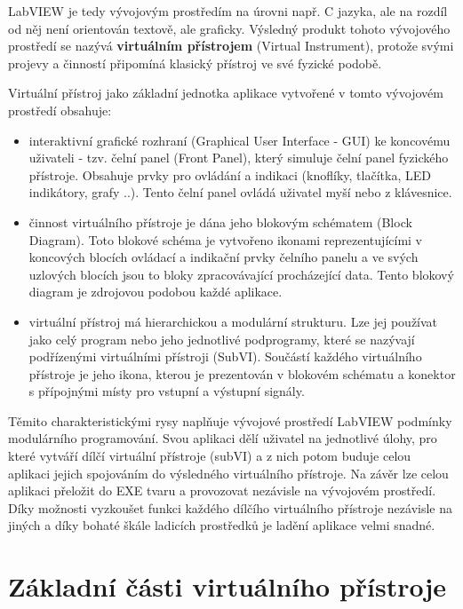    LabVIEW je tedy vývojovým prostředím na úrovni např. C jazyka, ale na rozdíl od něj není
   orientován textově, ale graficky. Výsledný produkt tohoto vývojového prostředí se nazývá
   \textbf{virtuálním přístrojem} (Virtual Instrument), protože svými projevy a činností připomíná
   klasický přístroj ve své fyzické podobě.
  
   Virtuální přístroj jako základní jednotka aplikace vytvořené v tomto vývojovém prostředí
   obsahuje:
   \begin{itemize}
     \item interaktivní grafické rozhraní (Graphical User Interface - GUI) ke koncovému uživateli -
           tzv. čelní panel (Front Panel), který simuluje čelní panel fyzického přístroje. Obsahuje
           prvky pro ovládání a indikaci (knoflíky, tlačítka, LED indikátory, grafy ..). Tento
           čelní panel ovládá uživatel myší nebo z klávesnice.
     \item činnost virtuálního přístroje je dána jeho blokovým schématem (Block Diagram). Toto
           blokové schéma je vytvořeno ikonami reprezentujícími v koncových blocích ovládací a
           indikační prvky čelního panelu a ve svých uzlových blocích jsou to bloky zpracovávající
           procházející data. Tento blokový diagram je zdrojovou podobou každé aplikace.
     \item virtuální přístroj má hierarchickou a modulární strukturu. Lze jej používat jako celý
           program nebo jeho jednotlivé podprogramy, které se nazývají podřízenými virtuálními
           přístroji (SubVI). Součástí každého virtuálního přístroje je jeho ikona, kterou je
           prezentován v blokovém schématu a konektor s přípojnými místy pro vstupní a výstupní
           signály.         
   \end{itemize}
  
   Těmito charakteristickými rysy naplňuje vývojové prostředí LabVIEW podmínky modulárního
   programování. Svou aplikaci dělí uživatel na jednotlivé úlohy, pro které vytváří dílčí virtuální
   přístroje (subVI) a z nich potom buduje celou aplikaci jejich spojováním do výsledného
   virtuálního přístroje. Na závěr lze celou aplikaci přeložit do EXE tvaru a provozovat nezávisle
   na vývojovém prostředí. Díky možnosti vyzkoušet funkci každého dílčího virtuálního přístroje
   nezávisle na jiných a díky bohaté škále ladicích prostředků je ladění aplikace velmi snadné.
   
 \section{Základní části virtuálního přístroje}
